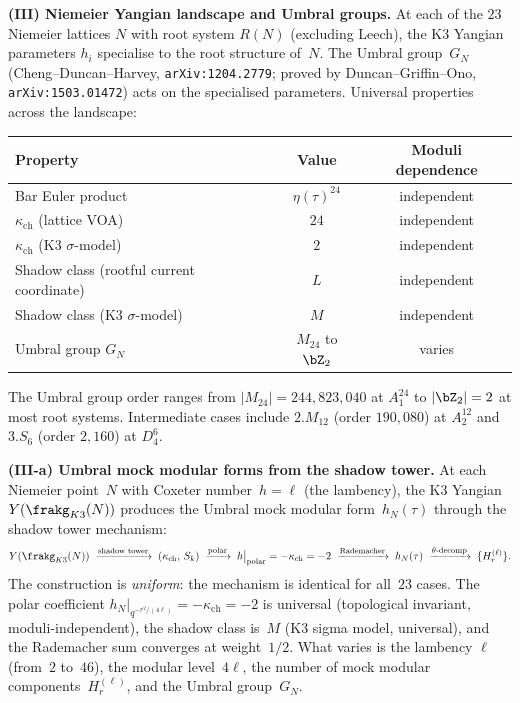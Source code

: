 \begin{conjecture}
\medskip\noindent
\textbf{(III) Niemeier Yangian landscape and Umbral groups.}
At each of the $23$ Niemeier lattices $N$ with root system $R(N)$
\textup{(}excluding Leech\textup{)}, the K3 Yangian parameters
$h_i$ specialise to the root structure of~$N$. The Umbral
group~$G_N$ (Cheng--Duncan--Harvey,
\texttt{arXiv:1204.2779}; proved by Duncan--Griffin--Ono,
\texttt{arXiv:1503.01472}) acts on the specialised parameters.
Universal properties across the landscape:
\begin{center}
\small
\renewcommand{\arraystretch}{1.2}
\begin{tabular}{lcc}
Property & Value & Moduli dependence \\
\hline
Bar Euler product & $\eta(\tau)^{24}$ & independent \\
$\kappa_{\mathrm{ch}}$ (lattice VOA) & $24$ & independent \\
$\kappa_{\mathrm{ch}}$ (K3 $\sigma$-model) & $2$ & independent \\
Shadow class (rootful current coordinate) & $L$ & independent \\
Shadow class (K3 $\sigma$-model) & $M$ & independent \\
Umbral group $G_N$ & $M_{24}$ to $\bZ_2$ & varies
\end{tabular}
\end{center}
The Umbral group order ranges from $|M_{24}| = 244{,}823{,}040$ at
$A_1^{24}$ to $|\bZ_2| = 2$ at most root systems. Intermediate cases
include $2.M_{12}$ (order $190{,}080$) at $A_2^{12}$ and $3.S_6$
(order $2{,}160$) at $D_4^6$.

\medskip\noindent
\textbf{(III-a) Umbral mock modular forms from the shadow tower.}
At each Niemeier point~$N$ with Coxeter number~$h = \ell$
(the lambency), the K3 Yangian $Y(\frakg_{K3}(N))$ produces the
Umbral mock modular form~$h_N(\tau)$ through the shadow tower
mechanism:
\begin{equation}\label{eq:umbral-uniform-construction}
Y(\frakg_{K3}(N))
\;\xrightarrow{\text{shadow tower}}\;
(\kappa_{\mathrm{ch}},\, S_k)
\;\xrightarrow{\text{polar}}\;
h\big|_{\text{polar}} = -\kappa_{\mathrm{ch}} = -2
\;\xrightarrow{\text{Rademacher}}\;
h_N(\tau)
\;\xrightarrow{\theta\text{-decomp}}\;
\{H_r^{(\ell)}\}.
\end{equation}
The construction is \emph{uniform}: the mechanism is identical for
all~$23$ cases. The polar coefficient $h_N\big|_{q^{-r^2/(4\ell)}} =
-\kappa_{\mathrm{ch}} = -2$ is universal (topological invariant,
moduli-independent), the shadow class is~$M$ (K3 sigma model, universal),
and the Rademacher sum converges at weight~$1/2$. What varies is the
lambency $\ell$ (from~$2$ to~$46$), the modular level~$4\ell$, the
number of mock modular components~$H_r^{(\ell)}$, and the Umbral
group~$G_N$.


\end{conjecture}
